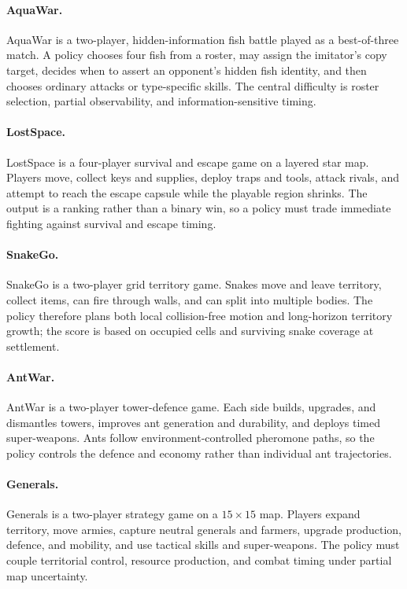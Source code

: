 \paragraph{AquaWar.} AquaWar is a two-player, hidden-information fish battle played as a
best-of-three match. A policy chooses four fish from a roster, may assign the imitator's
copy target, decides when to assert an opponent's hidden fish identity, and then chooses
ordinary attacks or type-specific skills. The central difficulty is roster selection,
partial observability, and information-sensitive timing.

\paragraph{LostSpace.} LostSpace is a four-player survival and escape game on a layered
star map. Players move, collect keys and supplies, deploy traps and tools, attack rivals,
and attempt to reach the escape capsule while the playable region shrinks. The output is
a ranking rather than a binary win, so a policy must trade immediate fighting against
survival and escape timing.

\paragraph{SnakeGo.} SnakeGo is a two-player grid territory game. Snakes move and leave
territory, collect items, can fire through walls, and can split into multiple bodies. The
policy therefore plans both local collision-free motion and long-horizon territory growth;
the score is based on occupied cells and surviving snake coverage at settlement.

\paragraph{AntWar.} AntWar is a two-player tower-defence game. Each side builds, upgrades,
and dismantles towers, improves ant generation and durability, and deploys timed
super-weapons. Ants follow environment-controlled pheromone paths, so the policy controls
the defence and economy rather than individual ant trajectories.

\paragraph{Generals.} Generals is a two-player strategy game on a $15\times15$ map. Players
expand territory, move armies, capture neutral generals and farmers, upgrade production,
defence, and mobility, and use tactical skills and super-weapons. The policy must couple
territorial control, resource production, and combat timing under partial map uncertainty.

